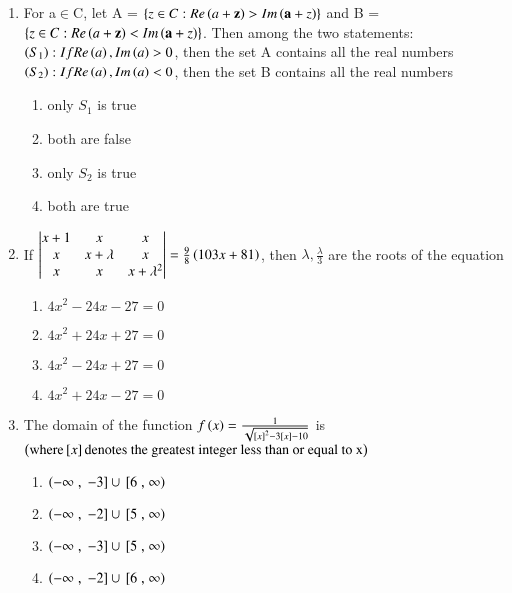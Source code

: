 \documentclass[journal]{IEEEtran}
\numberwithin{equation}{enumi}
\numberwithin{figure}{enumi}
\begin{document}
\begin{enumerate}
\item For a$\in$C, let A = $\left\{z\in C:Re\left(a+\mathbf{z}\right) > Im\left(\mathbf{a}+z\right)\right\}$ and B = $\left\{z\in C:Re\left(a+\mathbf{z}\right) < Im\left(\mathbf{a}+z\right)\right\}$. Then among the two statements: \\
$\left(S_1\right) : If Re\left(a\right), Im\left(a\right) > 0$, then the set A contains all the real numbers \\
$\left(S_2\right) : If Re\left(a\right), Im\left(a\right) < 0$, then the set B contains all the real numbers
\begin{enumerate}
\item only $S_1$ is true		
\item both are false
\item only $S_2$ is true
\item both are true
\end{enumerate}

\item If $\begin{vmatrix}x+1 & x & x \\
	x & x+\lambda & x \\
	x & x & x+\lambda^2\end{vmatrix} = \frac{9}{8}\left(103x+81\right)$, then $\lambda,\frac{\lambda}{3}$ are the roots of the equation
\begin{enumerate}
\item $4x^2-24x-27=0$            
\item $4x^2+24x+27=0$ 
\item $4x^2-24x+27=0$
\item $4x^2+24x-27=0$
\end{enumerate}

\item The domain of the function $f\left(x\right)=\frac{1}{\sqrt{{}\left[x\right]^2-3{}\left[x\right]-10}}$ is $\left(\text{where} {}\left[x\right] \text{denotes the greatest integer less than or equal to x}\right)$
\begin{enumerate}
\item $\left(-\infty\right.,{}\left.-3\right] \cup {}\left[6\right.,\left.\infty\right)$             
\item $\left(-\infty\right.,{}\left.-2\right] \cup {}\left[5\right.,\left.\infty\right)$
\item $\left(-\infty\right.,{}\left.-3\right] \cup {}\left[5\right.,\left.\infty\right)$
\item $\left(-\infty\right.,{}\left.-2\right] \cup {}\left[6\right.,\left.\infty\right)$
\end{enumerate}
\end{enumerate}
\end{document}

